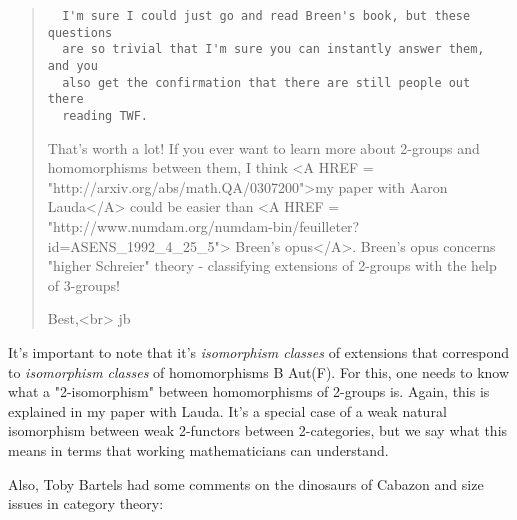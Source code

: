 \begin{quote}
\begin{verbatim}
  I'm sure I could just go and read Breen's book, but these questions
  are so trivial that I'm sure you can instantly answer them, and you
  also get the confirmation that there are still people out there
  reading TWF.
\end{verbatim}
    

That's worth a lot!  If you ever want to learn more about 2-groups 
and homomorphisms between them, I think 
<A HREF = "http://arxiv.org/abs/math.QA/0307200">my 
paper with Aaron Lauda</A>
could be easier than 
<A HREF = "http://www.numdam.org/numdam-bin/feuilleter?id=ASENS_1992_4_25_5">
Breen's opus</A>.  Breen's opus concerns "higher
Schreier" theory - classifying extensions of 2-groups with the help
of 3-groups!

Best,<br>
jb
\end{quote}

It's important to note that it's \emph{isomorphism classes} of extensions 
that correspond to \emph{isomorphism classes} of homomorphisms B \to  
Aut(F).  
For this, one needs to know what a "2-isomorphism" 
between homomorphisms 
of 2-groups is.  Again, this is explained in my paper with Lauda.  It's 
a special case of a weak natural isomorphism between weak 2-functors 
between 2-categories, but we say what this means in terms that working
mathematicians can understand. 

Also, Toby Bartels had some comments on the dinosaurs of Cabazon
and size issues in category theory:

